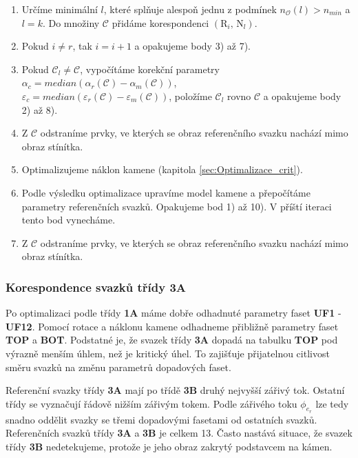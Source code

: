\begin{enumerate}
\item Určíme minimální $l$, které splňuje alespoň jednu z podmínek $n_{\mathcal{O}}(l) > n_{min}$  a $l = k$. Do množiny $\mathcal{C}$ přidáme korespondenci $\left(\mathrm{R}_i,\,\mathrm{N}_l \right)$.

\item Pokud $i \neq r$, tak $i = i+1$ a opakujeme body 3) až 7).

\item Pokud $\mathcal{C}_{l} \neq \mathcal{C}$, vypočítáme korekční parametry $\alpha_{c} = median(\alpha_{r}(\mathcal{C})-\alpha_{m}(\mathcal{C}))$, \\ $\varepsilon_{c} = median(\varepsilon_{r}(\mathcal{C})-\varepsilon_{m}(\mathcal{C}))$, položíme $\mathcal{C}_{l}$ rovno $\mathcal{C}$  a opakujeme body 2) až 8).

\item Z $\mathcal{C}$ odstraníme prvky, ve kterých se obraz referenčního svazku nachází mimo obraz stínítka.

\item Optimalizujeme náklon kamene (kapitola \ref{sec:Optimalizace_crit}).

\item Podle výsledku optimalizace upravíme model kamene a přepočítáme parametry referenčních svazků. Opakujeme bod 1) až 10). V příští iteraci tento bod vynecháme. 

\item Z $\mathcal{C}$ odstraníme prvky, ve kterých se obraz referenčního svazku nachází mimo obraz stínítka.

\end{enumerate}
\newpage
\subsubsection{Korespondence svazků třídy \textbf{3A}}	
\label{sec:3A}
	Po optimalizaci podle třídy \textbf{1A} máme dobře odhadnuté parametry faset \textbf{UF1} - \textbf{UF12}. Pomocí rotace a náklonu kamene odhadneme přibližně parametry faset \textbf{TOP} a \textbf{BOT}. Podstatné je, že svazek třídy \textbf{3A} dopadá na tabulku \textbf{TOP} pod výrazně menším úhlem, než je kritický úhel. To zajišťuje přijatelnou citlivost směru svazků na změnu parametrů dopadových faset. 
	
	Referenční svazky třídy \textbf{3A} mají po třídě \textbf{3B} druhý nejvyšší zářivý tok. Ostatní třídy se vyznačují řádově nižším zářivým tokem. Podle zářivého toku $\phi_{e_r}$  lze tedy snadno oddělit svazky se třemi dopadovými fasetami od ostatních svazků. Referenčních svazků třídy \textbf{3A} a \textbf{3B} je celkem 13. Často nastává situace, že svazek třídy \textbf{3B} nedetekujeme, protože je jeho obraz zakrytý podstavcem na kámen. 
	
